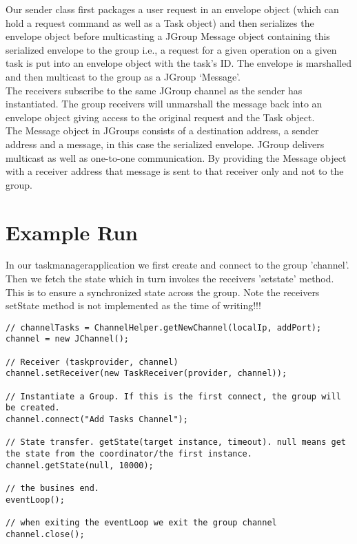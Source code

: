 Our sender class first packages a user request in an envelope object (which can hold a request command as well as a Task object) and then serializes the envelope object before multicasting a JGroup Message object containing this serialized envelope to the group i.e., 
a request for a given operation on a given task is put into an envelope object with the task’s ID. The envelope is marshalled and then multicast to the group as a JGroup ‘Message’.\\

The receivers subscribe to the same JGroup channel as the sender has instantiated. The group receivers will unmarshall the message back into an envelope object giving access to the original request and the Task object. \\

The Message object in JGroups consists of a destination address, a sender address and a message, in this case the serialized envelope. JGroup delivers
multicast as well as one-to-one communication. By providing the Message object with a receiver address that message is sent to that receiver only and not to the group.

\section{Example Run}
\label{jgroup_run}
In our taskmanagerapplication we first create and connect to the group 'channel'. Then we fetch the state which in turn invokes the receivers 'setstate' method. This is to ensure a synchronized state across the group. Note the receivers setState method is not implemented as the time of writing!!!   

\begin{lstlisting}[caption=group setup]
// channelTasks = ChannelHelper.getNewChannel(localIp, addPort);
channel = new JChannel();

// Receiver (taskprovider, channel) 
channel.setReceiver(new TaskReceiver(provider, channel));

// Instantiate a Group. If this is the first connect, the group will be created.
channel.connect("Add Tasks Channel");

// State transfer. getState(target instance, timeout). null means get the state from the coordinator/the first instance.        
channel.getState(null, 10000);

// the busines end.
eventLoop();

// when exiting the eventLoop we exit the group channel
channel.close();
\end{lstlisting}


